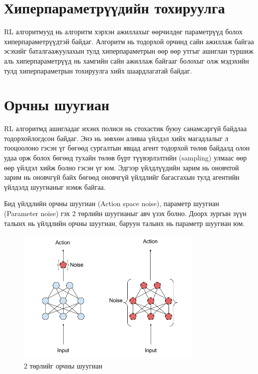 \documentclass[12pt,A4]{report}
\begin{document}
\section{Хиперпараметрүүдийн тохируулга}

RL алгоритмууд нь алгоритм хэрхэн ажиллахыг өөрчилдөг параметрүүд болох хиперпараметрүүдтэй байдаг. Алгоритм нь тодорхой орчинд сайн ажиллаж байгаа эсэхийг баталгаажуулахын тулд хиперпараметрын өөр өөр утгыг ашиглан туршиж аль хиперпараметрүүд нь хамгийн сайн ажиллаж байгааг болохыг олж мэдэхийн тулд хиперпараметрын тохируулга хийх шаардлагатай байдаг.

\section{Орчны шуугиан}

RL алгоритмд ашигладаг ихэнх полиси нь стохастик буюу санамсаргүй байдлаа тодорхойлогдсон байдаг. Энэ нь зөвхөн аливаа үйлдэл хийх магадлалыг л тооцоолоно гэсэн үг бөгөөд сургалтын явцад агент тодорхой төлөв байдалд олон удаа орж болох бөгөөд тухайн төлөв бүрт түүвэрлэлтийн (sampling) улмаас өөр өөр үйлдэл хийж болно гэсэн үг юм. Эдгээр үйлдлүүдийн зарим нь оновчтой зарим нь оновчгүй байх бөгөөд оновчгүй үйлдлийг багасгахын тулд агентийн үйлдэлд шуугианыг нэмж байгаа. 

Бид үйлдлийн орчны шуугиан (Action space noise), параметр шуугиан (Parameter noise) гэх 2 төрлийн шуугианыг авч үзэх болно. Доорх зургын зүүн талынх нь үйлдлийн орчны шуугиан, баруун талынх нь параметр шуугиан юм.

\begin{figure}[H]
\centering
\includegraphics[width=0.8\textwidth]{./images/p_diag_1}
\caption{2 төрлийг орчны шуугиан}
\end{figure}
\end{document}
